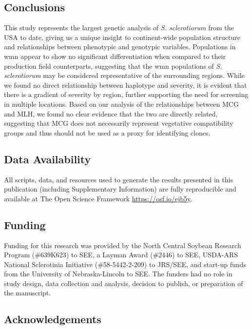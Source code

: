 \documentclass[fleqn,10pt,lineno]{wlpeerj} %
\theoremstyle{definition}
\theoremstyle{definition}
\theoremstyle{definition}
\theoremstyle{remark}
\begin{document}
\subsection*{Conclusions}\label{conclusions}

This study represents the largest genetic analysis of \emph{S.
sclerotiorum} from the USA to date, giving us a unique insight to
continent-wide population structure and relationships between phenotypic
and genotypic variables. Populations in wmn appear to show no
significant differentiation when compared to their production field
counterparts, suggesting that the wmn populations of \emph{S.
sclerotiorum} may be considered representative of the surrounding
regions. While we found no direct relationship between haplotype and
severity, it is evident that there is a gradient of severity by region,
further supporting the need for screening in multiple locations. Based
on our analysis of the relationships between MCG and MLH, we found no
clear evidence that the two are directly related, suggesting that MCG
does not necessarily represent vegetative compatibility groups and thus
should not be used as a proxy for identifying clones.

\subsection*{Data Availability}\label{data-availability}

All scripts, data, and resources used to generate the results presented
in this publication (including Supplementary Information) are fully
reproducible and available at The Open Science Framework
\url{https://osf.io/ejb5y}.

\subsection*{Funding}\label{funding}

Funding for this research was provided by the North Central Soybean
Research Program (\#639K623) to SEE, a Layman Award (\#2446) to SEE,
USDA-ARS National Sclerotinia Initiative (\#58-5442-2-209) to JRS/SEE,
and start-up funds from the University of Nebraska-Lincoln to SEE. The
funders had no role in study design, data collection and analysis,
decision to publish, or preparation of the manuscript.

\subsection*{Acknowledgements}\label{acknowledgements}
\end{document}
